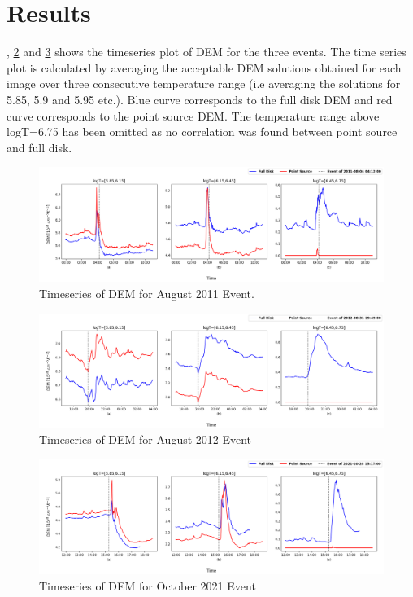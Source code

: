\section{Results}

, \cref{fig:dem_ts_aug_31_2012} and \cref{fig:dem_ts_oct_28_2021} shows the timeseries plot of DEM for the three events. The time series plot is calculated by averaging the acceptable DEM solutions obtained for each image over three consecutive temperature range (i.e averaging the solutions for 5.85, 5.9 and 5.95 etc.). Blue curve corresponds to the full disk DEM and red curve corresponds to the point source DEM. The temperature range above logT=6.75 has been omitted as no correlation was found between point source and full disk.

\begin{figure}[h!]
    \centering
    \includegraphics[width=\textwidth]{images/dem_ts_aug_04_2011.png}
    \caption[DEM Timeseries for August 2011 Event]{Timeseries of DEM for  August 2011 Event.}
    \label{fig:dem_ts_aug_04_2011}
\end{figure}

\begin{figure}[h!]
    \centering
    \includegraphics[width=\textwidth]{images/dem_ts_aug_31_2012.png}
    \caption[DEM Timeseries for August 2012 Event]{Timeseries of DEM for  August 2012 Event}
    \label{fig:dem_ts_aug_31_2012}
\end{figure}

\begin{figure}[h!]
    \centering
    \includegraphics[width=\textwidth]{images/dem_ts_oct_28_2021.png}
    \caption[DEM Timeseries for October 2021 Event]{Timeseries of DEM for  October 2021 Event}
    \label{fig:dem_ts_oct_28_2021}
\end{figure}

